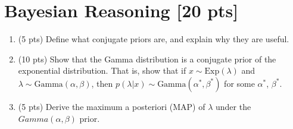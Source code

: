 \documentclass[11pt]{article}
\begin{document}
\section{Bayesian Reasoning [20 pts]}
\begin{enumerate}

\item (5 pts) Define what conjugate priors are, and explain why they are useful. \\
\begin{answertext}{3cm}{}  
\end{answertext} 

\item (10 pts) Show that the Gamma distribution is a conjugate prior of the exponential distribution. That is, show that if $x \sim \text{Exp}(\lambda)$ and $\lambda \sim \text{Gamma}(\alpha, \beta)$, then $p(\lambda | x) \sim \text{Gamma}(\alpha^*, \beta^*)$ for some $\alpha^*$, $\beta^*$. \\
\begin{answertext}{6cm}{}
\end{answertext} 



    \item (5 pts) Derive the maximum a posteriori (MAP) of \(\lambda\) under the \(Gamma\left(\alpha, \beta\right)\) prior. \\
\begin{answertext}{6cm}{}
\end{answertext} 

\end{enumerate}
\end{document}
